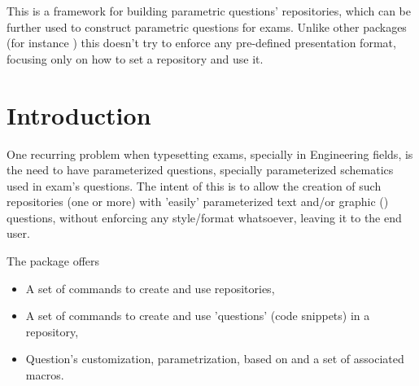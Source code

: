 \documentclass[10pt]{article}
\begin{document}
  
\begin{typesetabstract}

This is a framework for building parametric questions' repositories, which can be further used to construct parametric questions for exams. Unlike other packages (for instance ) this doesn't try to enforce any pre-defined presentation format, focusing only on how to set a repository and use it.
\end{typesetabstract}

\tableofcontents



\section{Introduction}
One recurring problem when typesetting exams, specially in Engineering fields, is the need to have parameterized questions, specially parameterized schematics used in exam's questions. The intent of this is to allow the creation of such repositories (one or more) with 'easily' parameterized text and/or graphic () questions, without enforcing any style/format whatsoever, leaving it to the end user.

The package offers
\begin{itemize}
  \item A set of commands to create and use repositories,
  \item A set of commands to create and use 'questions' (code snippets) in a repository,
  \item Question's customization, parametrization, based on  and a set of associated macros.
\end{itemize}
\end{document}
